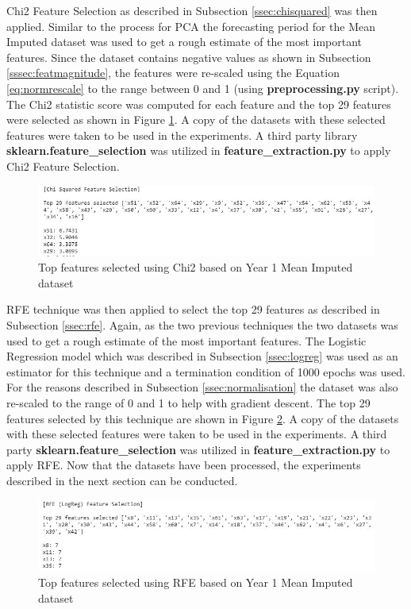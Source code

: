 \noindent Chi2 Feature Selection as described in Subsection \ref{ssec:chisquared} was then applied. Similar to the process for PCA the  forecasting period for the Mean Imputed dataset was used to get a rough estimate of the most important features. Since the dataset contains negative values as shown in Subsection \ref{sssec:featmagnitude}, the features were re-scaled using the Equation \ref{eq:normrescale} to the range between 0 and 1 (using \textbf{preprocessing.py} script). The Chi2 statistic score was computed for each feature and the top 29 features were selected as shown in Figure \ref{fig:chisqauredfeat}. A copy of the datasets with these selected features were taken to be used in the experiments. A third party library \textbf{sklearn.feature\_selection} \cite{python:sklearn_api} was utilized in \textbf{feature\_extraction.py} to apply Chi2 Feature Selection. \begin{figure}[H]
\centering
  \includegraphics[scale = 0.8]{imgs/chi_squared_feature.JPG}
  \caption{Top features selected using Chi2 based on Year 1 Mean Imputed dataset}
  \label{fig:chisqauredfeat}
\end{figure}
\noindent RFE technique was then applied to select the top 29 features as described in Subsection \ref{ssec:rfe}. Again, as the two previous techniques the two datasets was used to get a rough estimate of the most important features. The Logistic Regression model which was described in Subsection \ref{ssec:logreg} was used as an estimator for this technique and a termination condition of 1000 epochs was used. For the reasons described in Subsection \ref{ssec:normalisation} the dataset was also re-scaled to the range of 0 and 1 to help with gradient descent. The top 29 features selected by this technique are shown in Figure \ref{fig:rfefeat}. A copy of the datasets with these selected features were taken to be used in the experiments. A third party \textbf{sklearn.feature\_selection} \cite{python:sklearn_api} was utilized in \textbf{feature\_extraction.py} to apply RFE. Now that the datasets have been processed, the experiments described in the next section can be conducted.
\begin{figure}[H]
\centering
  \includegraphics[scale = 0.8]{imgs/rfe_feature.JPG}
  \caption{Top features selected using RFE based on Year 1 Mean Imputed dataset}
  \label{fig:rfefeat}
\end{figure}



